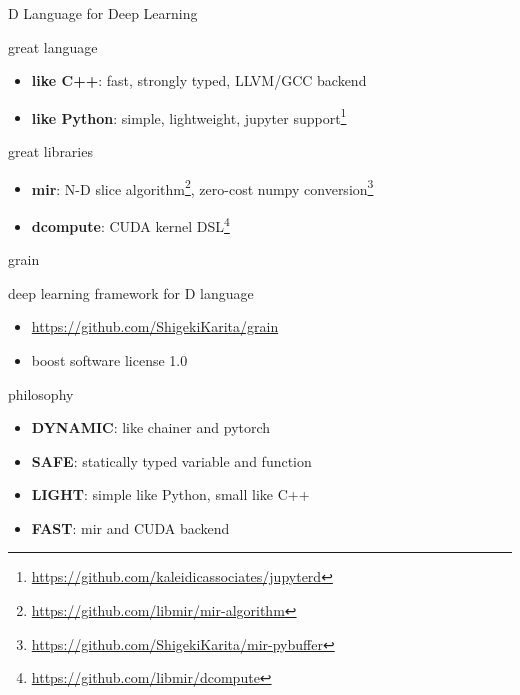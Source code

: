 \documentclass[aspectratio=169,
  14pt,xcolor=dvipsnames,table,professional font,dvipdfmx]{beamer}
\begin{document}

\begin{frame}{\alert{D L}anguage for \alert{D}eep \alert{L}earning}
  \begin{alertblock}{great language}
    \begin{itemize}
    \item \textbf{like C++}: fast, strongly typed, LLVM/GCC backend
    \item \textbf{like Python}: simple, lightweight, jupyter support\footnote{\url{https://github.com/kaleidicassociates/jupyterd}}
    \end{itemize}
  \end{alertblock}
  \begin{exampleblock}{great libraries}
    \begin{itemize}
    \item \textbf{mir}: N-D slice algorithm\footnote{\url{https://github.com/libmir/mir-algorithm}},
      zero-cost numpy conversion\footnote{\url{https://github.com/ShigekiKarita/mir-pybuffer}}
    \item \textbf{dcompute}: CUDA kernel DSL\footnote{\url{https://github.com/libmir/dcompute}}
    \end{itemize}
  \end{exampleblock}
\end{frame}

\begin{frame}{grain}
  \begin{alertblock}{deep learning framework for D language}
    \begin{itemize}
    \item \alert{\url{https://github.com/ShigekiKarita/grain}}
    \item boost software license 1.0
    \end{itemize}
  \end{alertblock}
  \begin{exampleblock}{philosophy}
    \begin{itemize}
    \item \textbf{DYNAMIC}: like chainer and pytorch
    \item \textbf{SAFE}: statically typed variable and function
    \item \textbf{LIGHT}: simple like Python, small like C++
    \item \textbf{FAST}: mir and CUDA backend
    \end{itemize}
  \end{exampleblock}
\end{frame}
\end{document}
